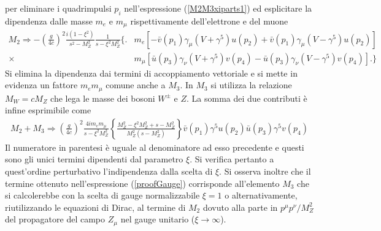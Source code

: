 \documentclass[11pt]{article}
\begin{document}
    per eliminare i quadrimpulsi $p_i$ nell'espressione (\ref{M2M3xiparts1}) ed esplicitare la dipendenza dalle masse $m_e$ e $m_\mu$ rispettivamente dell'elettrone e del muone
    \begin{equation}
    \begin{split}
    M_2\Rightarrow-\left(\frac{g}{4c}\right)^2 \frac{i(1-\xi^2)}{s^2-M_Z^2}\frac{1}{s-\xi^2 M_Z^2}\Big\{ \Big.&m_e[-\bar{v}(p_1)\gamma_\mu(V+\gamma^5)u(p_2)+\bar{v}(p_1)\gamma_\mu(V-\gamma^5)u(p_2)] \\
    \times &m_\mu[\bar{u}(p_3)\gamma_\nu(V+\gamma^5)v(p_4)-\bar{u}(p_3)\gamma_\nu(V-\gamma^5)v(p_4)]\Big. \Big\}
    \end{split}
    \end{equation}
    Si elimina la dipendenza dai termini di accoppiamento vettoriale e si mette in evidenza un fattore $m_em_\mu$ comune anche a $M_3$. In $M_3$ si utilizza la relazione $M_W=cM_Z$ che lega le masse dei bosoni $W^\pm$ e $Z$. La somma dei due contributi è infine
    esprimibile come
    \begin{equation}\label{proofGauge}
    \begin{split}
    M_2+M_3\Rightarrow\left(\frac{g}{4c}\right)^2\frac{4im_e m_\mu}{s-\xi^2M_Z^2}\left\{\frac{M_Z^2-\xi^2M_Z^2+s-M_Z^2}{M_Z^2(s-M_Z^2)}\right\}\bar{v}(p_1)\gamma^5u(p_2)\bar{u}(p_3)\gamma^5v(p_4)
    \end{split}
    \end{equation}
    Il numeratore in parentesi è uguale al denominatore ad esso precedente e questi sono gli unici termini dipendenti dal parametro $\xi$. Si verifica pertanto a quest'ordine perturbativo l'indipendenza dalla scelta di $\xi$. Si osserva inoltre che
    il termine ottenuto nell'espressione (\ref{proofGauge}) corrisponde all'elemento $M_3$ che si calcolerebbe con la scelta di gauge normalizzabile $\xi=1$ o alternativamente, riutilizzando le equazioni di Dirac, al termine di $M_2$ dovuto alla parte in
    $p^\mu p^\nu/M_Z^2$ del propagatore del campo $Z_\mu$ nel gauge unitario ($\xi\to\infty$).
\end{document}

